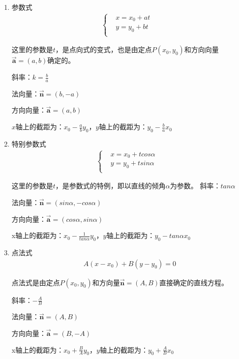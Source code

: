\begin{enumerate}
\item 参数式
\begin{eqnarray*}
\left\{
\begin{array}{cccc}
&x=x_0+at  & \\ 
&y = y_0+bt  & \\
\end{array}
\right.
\end{eqnarray*}\par
这里的参数是$t$，是点向式的变式，也是由定点$P(x_0,y_0)$和方向向量$\overrightarrow{\textbf{a}}=(a,b)$确定的。\par
斜率：$k = \frac{b}{a}$\par
法向量：$\overrightarrow{\textbf{n}}=(b,-a)$\par
方向向量：$\overrightarrow{\textbf{a}}=(a,b)$\par
$x$轴上的截距为：$x_0-\frac{a}{b}y_0$，$y$轴上的截距为：$y_0-\frac{b}{a}x_0$\par

\item 特别参数式
\begin{eqnarray*}
\left\{
\begin{array}{cccc}
&x=x_0+tcos\alpha   & \\ 
&y = y_0+tsin\alpha   & \\
\end{array}
\right.
\end{eqnarray*}\par
这里的参数是$t$，是参数式的特例，即以直线的倾角$\alpha$为参数。
斜率：$tan\alpha$ \par
法向量：$\overrightarrow{\textbf{n}}=(sin\alpha ,-cos\alpha )$\par
方向向量：$\overrightarrow{\textbf{a}}=(cos\alpha ,sin\alpha )$\par
x轴上的截距为：$x_0-\frac{1}{tan\alpha }y_0$，$y$轴上的截距为：$y_0-tan\alpha x_0$\par

\item 点法式
\begin{eqnarray*}
A(x-x_0)+B(y-y_0)=0
\end{eqnarray*}\par
点法式是由定点$P(x_0,y_0)$和方向量$\overrightarrow{\textbf{n}}=(A ,B)$直接确定的直线方程。\par
斜率：$-\frac{A}{B}$\par
法向量：$\overrightarrow{\textbf{n}}=(A ,B)$\par
方向向量：$\overrightarrow{\textbf{a}}=(B ,-A )$\par
x轴上的截距为：$x_0+\frac{B}{A}y_0$，$y$轴上的截距为：$y_0+\frac{A}{B} x_0$


\end{enumerate}
